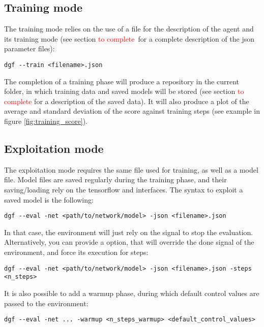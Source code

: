 \subsection{Training mode}

The training mode relies on the use of a  file for the description of the agent and its training mode (see section \textcolor{red}{to complete} for a complete description of the json parameter files):

\begin{verbatim}
dgf --train <filename>.json
\end{verbatim}

The completion of a training phase will produce a  repository in the current folder, in which training data and saved models will be stored (see section \textcolor{red}{to complete} for a description of the saved data). It will also produce a plot of the average and standard deviation of the score against training steps (see example in figure \ref{fig:training_score}).



\subsection{Exploitation mode}

The exploitation mode requires the same  file used for training, as well as a model file. Model files are saved regularly during the training phase, and their saving/loading rely on the tensorflow  and  interfaces. The syntax to exploit a saved model is the following:

\begin{verbatim}
dgf --eval -net <path/to/network/model> -json <filename>.json 
\end{verbatim}

In that case, the environment will just rely on the  signal to stop the evaluation. Alternatively, you can provide a  option, that will override the done signal of the environment, and force its execution for  steps:

\begin{verbatim}
dgf --eval -net <path/to/network/model> -json <filename>.json -steps <n_steps>
\end{verbatim}

It is also possible to add a warmup phase, during which default control values are passed to the environment:

\begin{verbatim}
dgf --eval -net ... -warmup <n_steps_warmup> <default_control_values>
\end{verbatim}